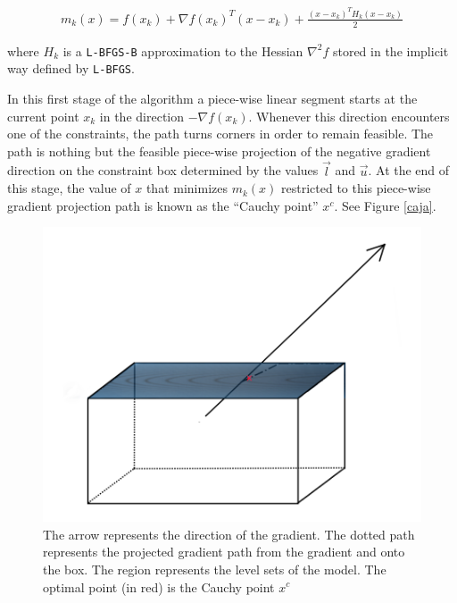 \begin{equation} \label{themodel}
  \begin{aligned}
    m_k(x) = f(x_k) + \nabla f(x_k)^T ( x - x_k) + \frac{(x - x_k)^T H_k (x - x_k) }{2}
  \end{aligned}
\end{equation}

where $H_k$ is a \texttt{L-BFGS-B} approximation to the Hessian $\nabla^2 f$ stored in the implicit way defined by \texttt{L-BFGS}.

In this first stage of the algorithm a piece-wise linear segment starts at the current point $x_k$ in the direction $-\nabla f(x_k)$. Whenever this direction encounters one of the constraints, the path turns corners in order to remain feasible. The path is nothing but the feasible piece-wise projection of the negative gradient direction on the constraint box determined by the values $\overrightarrow{l}$ and $\overrightarrow{u}$. At the end of this stage, the value of $x$ that minimizes $m_k(x)$ restricted to this piece-wise gradient projection path is known as the ``Cauchy point'' $x^c$. See Figure \eqref{caja}.

\begin{figure}
\begin{center}
\includegraphics[scale=0.4]{Figures/cajapresentation2.png}
\caption[Graphical Representation of Gradient Projection]{The arrow represents the direction of the gradient. The dotted path represents the projected gradient path from the gradient and onto the box. The region represents the level sets of the model. The optimal point (in red) is the Cauchy point $x^c$}
\label{caja}
\end{center}
\end{figure}

